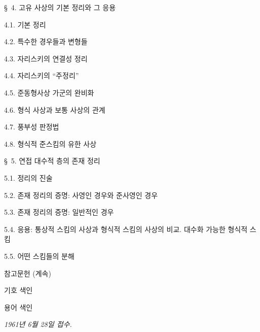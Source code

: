 \begin{flushleft}
\medskip
\S~4. 고유 사상의 기본 정리와 그 응용 

4.1. 기본 정리 

4.2. 특수한 경우들과 변형들 

4.3. 자리스키의 연결성 정리 

4.4. 자리스키의 ``주정리'' 

4.5. 준동형사상 가군의 완비화 

4.6. 형식 사상과 보통 사상의 관계 

4.7. 풍부성 판정법 

4.8. 형식적 준스킴의 유한 사상 


\S~5. 연접 대수적 층의 존재 정리 

5.1. 정리의 진술 

5.2. 존재 정리의 증명: 사영인 경우와 준사영인 경우

5.3. 존재 정리의 증명: 일반적인 경우 

5.4. 응용: 통상적 스킴의 사상과 형식적 스킴의 사상의 비교.
대수화 가능한 형식적 스킴 

5.5. 어떤 스킴들의 분해 

\medskip
\textsc{참고문헌 (계속)} 

\textsc{기호 색인} 

\textsc{용어 색인} 

\begin{flushright}
\emph{1961년 6월 28일 접수.}
\end{flushright}
\end{flushleft}
